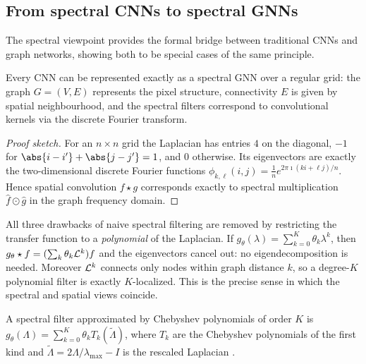 \subsection{From spectral CNNs to spectral GNNs}
\label{sec:graphs:cheb}

The spectral viewpoint provides the formal bridge between traditional CNNs and
graph networks, showing both to be special cases of the same principle.

\begin{theorem}
\label{thm:graphs:cnn-spectral}
Every CNN can be represented exactly as a spectral GNN over a regular grid: the
graph $G = (V, E)$ represents the pixel structure, connectivity $E$ is given by
spatial neighbourhood, and the spectral filters correspond to convolutional
kernels via the discrete Fourier transform.
\end{theorem}

\begin{proof}[Proof sketch]
For an $n \times n$ grid the Laplacian has entries $4$ on the diagonal, $-1$ for
$\abs{i-i'}+\abs{j-j'} = 1$, and $0$ otherwise. Its eigenvectors are exactly the
two-dimensional discrete Fourier functions
$\phi_{k,\ell}(i,j) = \frac1n e^{2\pi\imath(ki+\ell j)/n}$. Hence spatial
convolution $f \star g$ corresponds exactly to spectral multiplication
$\hat f \odot \hat g$ in the graph frequency domain.
\end{proof}

All three drawbacks of naive spectral filtering are removed by restricting the
transfer function to a \emph{polynomial} of the Laplacian. If
$g_\theta(\lambda) = \sum_{k=0}^K \theta_k \lambda^k$, then
$g_\theta \star f = (\sum_k \theta_k \mathcal{L}^k) f$ and the eigenvectors cancel out:
no eigendecomposition is needed. Moreover $\mathcal{L}^k$ connects only nodes within
graph distance $k$, so a degree-$K$ polynomial filter is exactly $K$-localized.
This is the precise sense in which the spectral and spatial views coincide.

\begin{definition}
\label{def:graphs:chebnet}
A spectral filter approximated by Chebyshev polynomials of order $K$ is
$g_\theta(\Lambda) = \sum_{k=0}^K \theta_k T_k(\tilde\Lambda)$, where $T_k$ are
the Chebyshev polynomials of the first kind and
$\tilde\Lambda = 2\Lambda/\lambda_{\max} - I$ is the rescaled Laplacian
\citep{defferrard2017convolutionalneuralnetworksgraphs}.
\end{definition}

